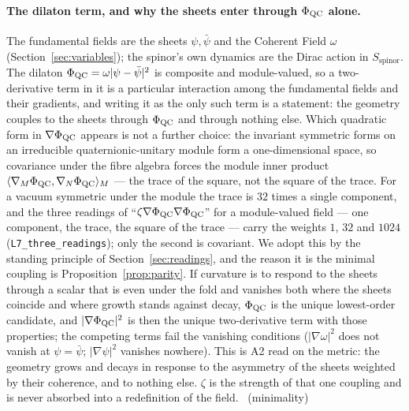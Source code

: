 \paragraph{The dilaton term, and why the sheets enter through $\Phi_{\mathrm{QC}}$ alone.}
The fundamental fields are the sheets $\psi,\bar\psi$ and the Coherent
Field $\omega$ (Section~\ref{sec:variables}); the spinor's own dynamics are
the Dirac action in $S_{\mathrm{spinor}}$. The dilaton
$\Phi_{\mathrm{QC}}=\omega\lvert\psi-\bar\psi\rvert^{2}$ is composite and module-valued, so a
two-derivative term in it is a particular interaction among the
fundamental fields and their gradients, and writing it as the only such
term is a statement: the geometry couples to the sheets through $\Phi_{\mathrm{QC}}$ and
through nothing else. Which quadratic form in $\nabla\Phi_{\mathrm{QC}}$ appears is not a
further choice: the invariant symmetric forms on an irreducible
quaternionic-unitary module form a one-dimensional space, so covariance
under the fibre algebra forces the module inner product
$\langle\nabla_{M}\Phi_{\mathrm{QC}},\nabla_{N}\Phi_{\mathrm{QC}}\rangle_{M}$ --- the trace of the square,
not the square of the trace. For a vacuum symmetric under the module the
trace is $32$ times a single component, and the three readings of
``$\zeta\nabla\Phi_{\mathrm{QC}}\nabla\Phi_{\mathrm{QC}}$'' for a module-valued field --- one component,
the trace, the square of the trace --- carry the weights $1$, $32$ and $1024$
(\texttt{L7\_three\_readings}); only the second is covariant. \rigR
We adopt this by the standing principle of Section~\ref{sec:readings}, and
the reason it is the minimal coupling is Proposition~\ref{prop:parity}. If curvature is to respond to the sheets
through a scalar that is even under the fold and vanishes both where the
sheets coincide and where growth stands against decay, $\Phi_{\mathrm{QC}}$ is the unique
lowest-order candidate, and $\lvert\nabla\Phi_{\mathrm{QC}}\rvert^{2}$ is then the unique
two-derivative term with those properties; the competing terms fail the
vanishing conditions ($\lvert\nabla\omega\rvert^{2}$ does not vanish at
$\psi=\bar\psi$; $\lvert\nabla\psi\rvert^{2}$ vanishes nowhere). This is
A2 read on the metric: the geometry grows and decays in response to the
asymmetry of the sheets weighted by their coherence, and to nothing else.
$\zeta$ is the strength of that one coupling and is never absorbed into a
redefinition of the field. \rigD\ (minimality)

